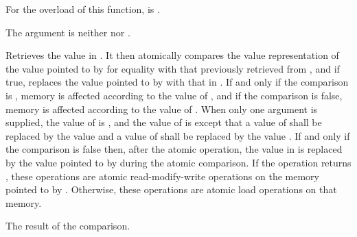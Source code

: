 \begin{itemdescr}
\pnum
\constraints
For the  overload of this function,
 is .

\pnum
\expects
The  argument is neither  nor
.

\pnum
\effects
Retrieves the value in . It then atomically
compares the value representation of the value pointed to by 
for equality with that previously retrieved from ,
and if true, replaces the value pointed to
by  with that in .
If and only if the comparison is , memory is affected according to the
value of , and if the comparison is false, memory is affected according
to the value of . When only one  argument is
supplied, the value of  is , and the value of
 is  except that a value of 
shall be replaced by the value  and a value of
 shall be replaced by the value
.
If and only if the comparison is false then, after the atomic operation,
the value in  is replaced by the value
pointed to by  during the atomic comparison.
If the operation returns , these
operations are atomic read-modify-write
operations on the memory
pointed to by .
Otherwise, these operations are atomic load operations on that memory.

\pnum
\returns
The result of the comparison.


\end{itemdescr}
